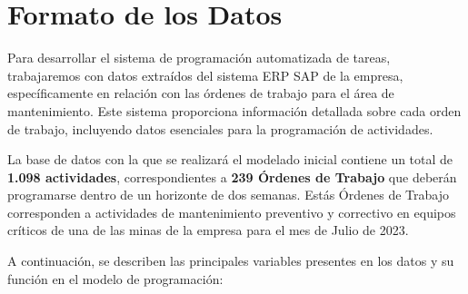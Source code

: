 \documentclass{article}
\begin{document}
\section{Formato de los Datos}

Para desarrollar el sistema de programación automatizada de tareas, trabajaremos con datos extraídos del sistema ERP SAP de la empresa, específicamente en relación con las órdenes de trabajo para el área de mantenimiento. Este sistema proporciona información detallada sobre cada orden de trabajo, incluyendo datos esenciales para la programación de actividades. 

La base de datos con la que se realizará el modelado inicial contiene un total de \textbf{1.098 actividades}, correspondientes a \textbf{239 Órdenes de Trabajo} que deberán programarse dentro de un horizonte de dos semanas. Estás Órdenes de Trabajo corresponden a actividades de mantenimiento preventivo y correctivo en equipos críticos de una de las minas de la empresa para el mes de Julio de 2023.

A continuación, se describen las principales variables presentes en los datos y su función en el modelo de programación:
\end{document}
